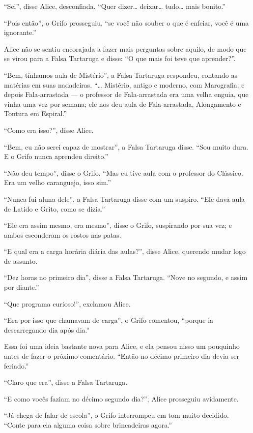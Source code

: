 ``Sei'', disse Alice, desconfiada. ``Quer dizer\ldots{} deixar\ldots{} tudo\ldots{} mais
bonito.''

``Pois então'', o Grifo prosseguiu, ``se você não souber o que é
enfeiar, você é uma ignorante.''

Alice não se sentiu encorajada a fazer mais perguntas sobre aquilo, de
modo que se virou para a Falsa Tartaruga e disse: ``O que mais foi teve
que aprender?''.

``Bem, tínhamos aula de Mistério'', a Falsa Tartaruga respondeu,
contando as matérias em suas nadadeiras. ``\ldots{} Mistério, antigo e
moderno, com Marografia: e depois Fala-arrastada --- o professor de
Fala-arrastada era uma velha enguia, que vinha uma vez por semana; ele
nos deu aula de Fala-arrastada, Alongamento e Tontura em Espiral.''

``Como era isso?'', disse Alice.

``Bem, eu não serei capaz de mostrar'', a Falsa Tartaruga disse. ``Sou
muito dura. E o Grifo nunca aprendeu direito.''

``Não deu tempo'', disse o Grifo. ``Mas eu tive aula com o professor do
Clássico. Era um velho caranguejo, isso sim.''

``Nunca fui aluna dele'', a Falsa Tartaruga disse com um suspiro. ``Ele
dava aula de Latido e Grito, como se dizia.''

``Ele era assim mesmo, era mesmo'', disse o Grifo, suspirando por sua
vez; e ambos esconderam os rostos nas patas.

``E qual era a carga horária diária das aulas?'', disse Alice, querendo
mudar logo de assunto.

``Dez horas no primeiro dia'', disse a Falsa Tartaruga. ``Nove no
segundo, e assim por diante.''

``Que programa curioso!'', exclamou Alice.

``Era por isso que chamavam de carga'', o Grifo comentou, ``porque ia
descarregando dia após dia.''

Essa foi uma ideia bastante nova para Alice, e ela pensou nisso um
pouquinho antes de fazer o próximo comentário. ``Então no
décimo primeiro dia devia ser feriado.''

``Claro que era'', disse a Falsa Tartaruga.

``E como vocês faziam no décimo segundo dia?'', Alice prosseguiu
avidamente.

``Já chega de falar de escola'', o Grifo interrompeu em tom muito
decidido. ``Conte para ela alguma coisa sobre brincadeiras agora.''

